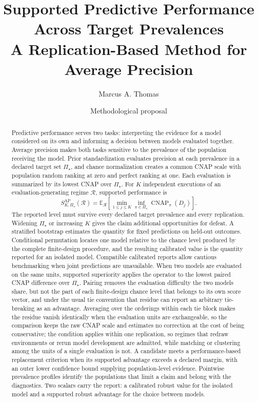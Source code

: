 \documentclass[11pt]{article}
\title{Supported Predictive Performance Across Target Prevalences\\
\large A Replication-Based Method for Average Precision}
\author{Marcus A. Thomas}
\date{Methodological proposal}
\newcommand{\CNAP}{\operatorname{CNAP}}
\newcommand{\Regime}{\mathcal{R}}
\newcommand{\PSet}{\Pi_\star}
\newcommand{\E}{\mathbb{E}}
\theoremstyle{remark}
\begin{document}
\maketitle

\begin{abstract}
Predictive performance serves two tasks: interpreting the evidence for a model considered on its own and informing a decision between models evaluated together. Average precision makes both tasks sensitive to the prevalence of the population receiving the model. Prior standardization evaluates precision at each prevalence in a declared target set $\PSet$, and chance normalization creates a common CNAP scale with population random ranking at zero and perfect ranking at one. Each evaluation is summarized by its lowest CNAP over $\PSet$. For $K$ independent executions of an evaluation-generating regime $\Regime$, supported performance is
\[
S_{K,\PSet}^{\mathrm{AP}}(\Regime)
=
\E_{\Regime}
\left[
\min_{1\leq j\leq K}
\inf_{\pi\in\PSet}\CNAP_\pi(D_j)
\right].
\]
The reported level must survive every declared target prevalence and every replication. Widening $\PSet$ or increasing $K$ gives the claim additional opportunities for defeat. A stratified bootstrap estimates the quantity for fixed predictions on held-out outcomes. Conditional permutation locates one model relative to the chance level produced by the complete finite-design procedure, and the resulting calibrated value is the quantity reported for an isolated model. Compatible calibrated reports allow cautious benchmarking when joint predictions are unavailable. When two models are evaluated on the same units, supported superiority applies the operator to the lowest paired CNAP difference over $\PSet$. Pairing removes the evaluation difficulty the two models share, but not the part of each finite-design chance level that belongs to its own score vector, and under the usual tie convention that residue can report an arbitrary tie-breaking as an advantage. Averaging over the orderings within each tie block makes the residue vanish identically when the evaluation units are exchangeable, so the comparison keeps the raw CNAP scale and estimates no correction at the cost of being conservative; the condition applies within one replication, so regimes that redraw environments or rerun model development are admitted, while matching or clustering among the units of a single evaluation is not. A candidate meets a performance-based replacement criterion when its supported advantage exceeds a declared margin, with an outer lower confidence bound supplying population-level evidence. Pointwise prevalence profiles identify the populations that limit a claim and belong with the diagnostics. Two scalars carry the report: a calibrated robust value for the isolated model and a supported robust advantage for the choice between models.
\end{abstract}
\end{document}
